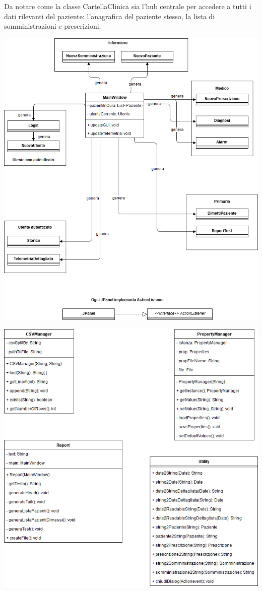 \documentclass[a4paper]{report}
\begin{document}
                Da notare come la classe CartellaClinica sia l'hub centrale per accedere a tutti i dati rilevanti del paziente: l'anagrafica del paziente stesso, la lista di somministrazioni e prescrizioni.
                \begin{center}
                    \includegraphics[scale=0.5]{class/GUIPackage.png}
                \end{center}
                \begin{center}
                    \includegraphics[scale=0.5]{class/UtilityPackage.png}
                \end{center}
    \newpage
\end{document}
